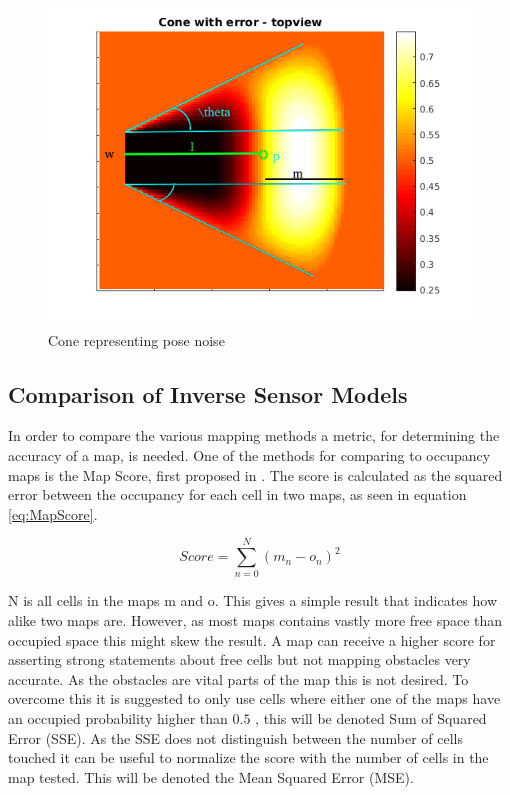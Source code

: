 \begin{figure}[htbp]
	\centering
	\includegraphics[width=\textwidth]{figures/static_mapping/cone_noise_top}
	\caption{Cone representing pose noise}
	\label{fig:cone_with_noise_top}
\end{figure}

\subsection{Comparison of Inverse Sensor Models}
In order to compare the various mapping methods a metric, for determining the accuracy of a map, is needed. One of the methods for comparing to occupancy maps is the Map Score, first proposed in \cite{MoravecMartin}. The score is calculated as the squared error between the occupancy for each cell in two maps, as seen in equation \vref{eq:MapScore}.

\begin{equation}
\label{eq:MapScore}
Score = \sum_{n=0}^{N} (m_{n} - o_{n})^2
\end{equation}

N is all cells in the maps m and o. 
This gives a simple result that indicates how alike two maps are. 
However, as most maps contains vastly more free space than occupied space this might skew the result. 
A map can receive a higher score for asserting strong statements about free cells but not mapping obstacles very accurate. 
As the obstacles are vital parts of the map this is not desired. 
To overcome this it is suggested to only use cells where either one of the maps have an occupied probability higher than \(0.5\) \cite{Sullivan2003}, this will be denoted Sum of Squared Error (SSE).
As the SSE does not distinguish between the number of cells touched it can be useful to normalize the score with the number of cells in the map tested. This will be denoted the Mean Squared Error (MSE).  

